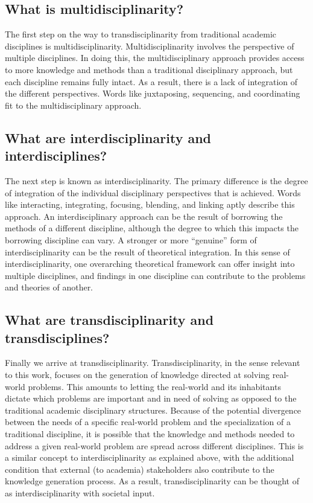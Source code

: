 \documentclass[a4paper]{article}
\begin{document}
\subsection{What is multidisciplinarity?}

The first step on the way to transdisciplinarity from traditional academic
disciplines is multidisciplinarity. Multidisciplinarity involves the
perspective of multiple disciplines. In doing this, the multidisciplinary
approach provides access to more knowledge and methods than a traditional
disciplinary approach, but each discipline remains fully intact. As a result,
there is a lack of integration of the different perspectives. Words like
juxtaposing, sequencing, and coordinating fit to the multidisciplinary
approach.

\subsection{What are interdisciplinarity and interdisciplines?}

The next step is known as interdisciplinarity. The primary difference is the
degree of integration of the individual disciplinary perspectives that is
achieved. Words like interacting, integrating, focusing, blending, and linking
aptly describe this approach. An interdisciplinary approach can be the result
of borrowing the methods of a different discipline, although the degree to
which this impacts the borrowing discipline can vary. A stronger or more
``genuine'' form of interdisciplinarity can be the result of theoretical
integration. In this sense of interdisciplinarity, one overarching theoretical
framework can offer insight into multiple disciplines, and findings in one
discipline can contribute to the problems and theories of another.


\subsection{What are transdisciplinarity and transdisciplines?}

Finally we arrive at transdisciplinarity. Transdisciplinarity, in the sense
relevant to this work, focuses on the generation of knowledge directed at
solving real-world problems. This amounts to letting the real-world and its
inhabitants dictate which problems are important and in need of solving as
opposed to the traditional academic disciplinary structures. Because of the
potential divergence between the needs of a specific real-world problem and
the specialization of a traditional discipline, it is possible that the
knowledge and methods needed to address a given real-world problem are spread
across different disciplines. This is a similar concept to interdisciplinarity
as explained above, with the additional condition that external (to academia)
stakeholders also contribute to the knowledge generation process. As a result,
transdisciplinarity can be thought of as interdisciplinarity with societal
input. 
\end{document}
